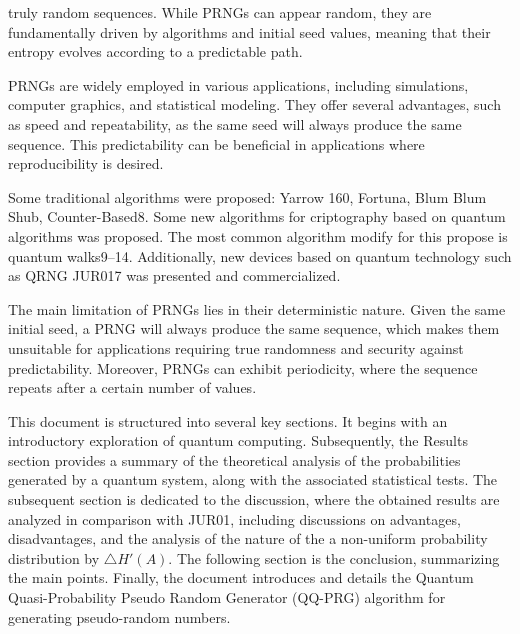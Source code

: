 \documentclass[12pt]{article}
\begin{document}
{	truly random sequences. While PRNGs can appear random, they are fundamentally driven by algorithms and initial seed values,
	meaning that their entropy evolves according to a predictable path.\par
	PRNGs are widely employed in various applications, including simulations, computer graphics, and statistical modeling.
	They offer several advantages, such as speed and repeatability, as the same seed will always produce the same sequence. This
	predictability can be beneficial in applications where reproducibility is desired.\par
	Some traditional algorithms were proposed: Yarrow 160, Fortuna, Blum Blum Shub, Counter-Based8. Some new algorithms
	for criptography based on quantum algorithms was proposed. The most common algorithm modify for this propose is quantum
	walks9–14. Additionally, new devices based on quantum technology such as QRNG JUR017 was presented and commercialized.\par
	The main limitation of PRNGs lies in their deterministic nature. Given the same initial seed, a PRNG will always produce
	the same sequence, which makes them unsuitable for applications requiring true randomness and security against predictability.
	Moreover, PRNGs can exhibit periodicity, where the sequence repeats after a certain number of values.\par
	This document is structured into several key sections. It begins with an introductory exploration of quantum computing\cite{a16}.
	Subsequently, the Results section provides a summary of the theoretical analysis of the probabilities generated by a quantum
	system, along with the associated statistical tests. The subsequent section is dedicated to the discussion, where the obtained
	results are analyzed in comparison with JUR01, including discussions on advantages, disadvantages, and the analysis of the
	nature of the a non-uniform probability distribution by $\triangle H '(A)$. The following section is the conclusion, summarizing the main
	points. Finally, the document introduces and details the Quantum Quasi-Probability Pseudo Random Generator (QQ-PRG) algorithm for generating pseudo-random numbers\cite{a17}.}\\
	
\end{document}
